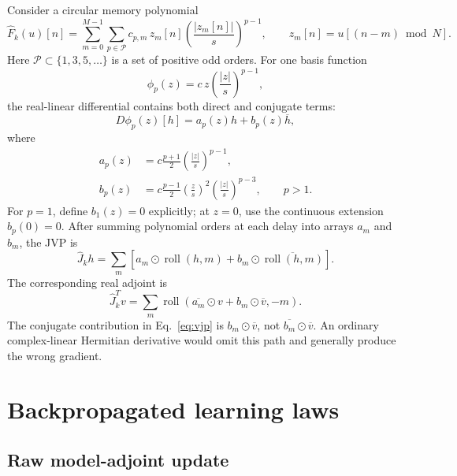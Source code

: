 \documentclass[10pt,a4paper]{article}
\newcommand{\roll}{\operatorname{roll}}
\newcommand{\Fhat}{\widehat F}
\newcommand{\Jhat}{\widehat J}
\begin{document}
Consider a circular memory polynomial \cite{morgan2006gmp}
\begin{equation}
  \Fhat_k(u)[n]
  =\sum_{m=0}^{M-1}\sum_{p\in\mathcal P}
  c_{p,m}\,z_m[n]
  \left(\frac{|z_m[n]|}{s}\right)^{p-1},
  \qquad
  z_m[n]=u[(n-m)\bmod N].
  \label{eq:memory-polynomial}
\end{equation}
Here $\mathcal P\subset\{1,3,5,\ldots\}$ is a set of positive odd orders. For one basis function
\begin{equation}
  \phi_p(z)=c\,z\left(\frac{|z|}{s}\right)^{p-1},
\end{equation}
the real-linear differential contains both direct and conjugate terms:
\begin{equation}
  D\phi_p(z)[h]=a_p(z)h+b_p(z)\overline h,
  \label{eq:basis-differential}
\end{equation}
where
\begin{align}
  a_p(z)
  &=c\frac{p+1}{2}
    \left(\frac{|z|}{s}\right)^{p-1}, \\
  b_p(z)
  &=c\frac{p-1}{2}
    \left(\frac{z}{s}\right)^2
    \left(\frac{|z|}{s}\right)^{p-3},
  \qquad p>1.
\end{align}
For $p=1$, define $b_1(z)=0$ explicitly; at $z=0$, use the continuous extension $b_p(0)=0$. After summing
polynomial orders at each delay into arrays $a_m$ and $b_m$, the JVP is
\begin{equation}
  \Jhat_k h
  =\sum_m\left[
    a_m\odot\roll(h,m)
    +b_m\odot\overline{\roll(h,m)}
  \right].
  \label{eq:jvp}
\end{equation}
The corresponding real adjoint is
\begin{equation}
  \Jhat_k^T v
  =\sum_m\roll\!\left(
    \overline{a_m}\odot v+b_m\odot\overline v,-m
  \right).
  \label{eq:vjp}
\end{equation}
The conjugate contribution in Eq.~\eqref{eq:vjp} is $b_m\odot\overline v$, not
$\overline{b_m}\odot\overline v$. An ordinary complex-linear Hermitian derivative would omit this path and generally
produce the wrong gradient.

\section{Backpropagated learning laws}

\subsection{Raw model-adjoint update}
\end{document}
